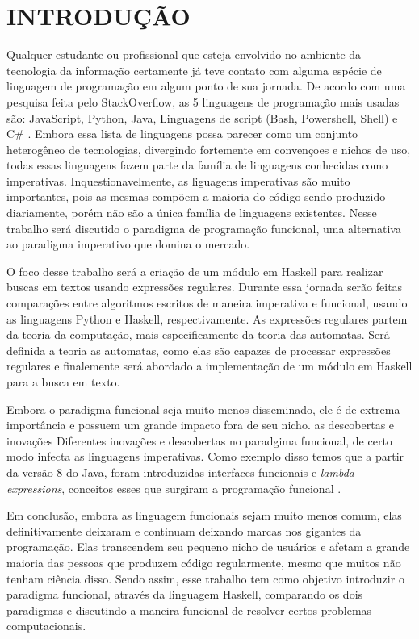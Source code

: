 \section{INTRODUÇÃO}
Qualquer estudante ou profissional que esteja envolvido no ambiente da tecnologia da informação certamente já teve contato com alguma espécie de linguagem de programação em algum ponto de sua jornada.
De acordo com uma pesquisa feita pelo StackOverflow, as 5 linguagens de programação mais usadas são: JavaScript, Python, Java, Linguagens de script (Bash, Powershell, Shell) e C\# \cite{stack-overflow}.
Embora essa lista de linguagens possa parecer como um conjunto heterogêneo de tecnologias, divergindo fortemente em convençoes e nichos de uso, todas essas linguagens fazem parte da família de linguagens conhecidas como imperativas.
Inquestionavelmente, as liguagens imperativas são muito importantes, pois as mesmas compõem a maioria do código sendo produzido diariamente, porém não são a única família de linguagens existentes.
Nesse trabalho será discutido o paradigma de programação funcional, uma alternativa ao paradigma imperativo que domina o mercado.

O foco desse trabalho será a criação de um módulo em Haskell para realizar buscas em textos usando expressões regulares.
Durante essa jornada serão feitas comparações entre algoritmos escritos de maneira imperativa e funcional, usando as linguagens Python e Haskell, respectivamente.
As expressões regulares partem da teoria da computação, mais especificamente da teoria das automatas.
Será definida a teoria as automatas, como elas são capazes de processar expressões regulares e finalemente será abordado a implementação de um módulo em Haskell para a busca em texto.

Embora o paradigma funcional seja muito menos disseminado, ele é de extrema importância e possuem um grande impacto fora de seu nicho. as descobertas e inovações 
Diferentes inovações e descobertas no paradgima funcional, de certo modo infecta as linguagens imperativas.
Como exemplo disso temos que a partir da versão 8 do Java, foram introduzidas interfaces funcionais e \emph{lambda expressions}, conceitos esses que surgiram a programação funcional \cite{java8}.

Em conclusão, embora as linguagem funcionais sejam muito menos comum, elas definitivamente deixaram e continuam deixando marcas nos gigantes da programação.
Elas transcendem seu pequeno nicho de usuários e afetam a grande maioria das pessoas que produzem código regularmente, mesmo que muitos não tenham ciência disso.
Sendo assim, esse trabalho tem como objetivo introduzir o paradigma funcional, através da linguagem Haskell, comparando os dois paradigmas e discutindo a maneira funcional de resolver certos problemas computacionais.
